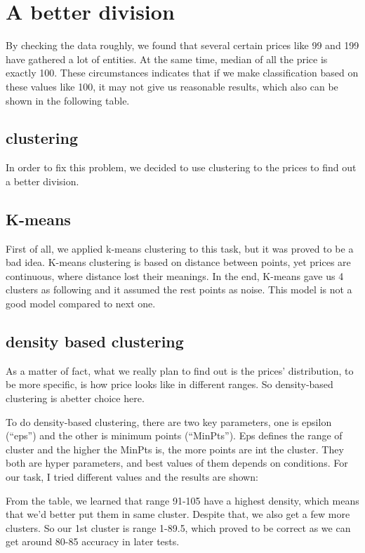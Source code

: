 \documentclass{sig-alternate}
\begin{document}
	\section{A better division}
	By checking the data roughly, we found that several certain prices like 99 and 199 have gathered
	a lot of entities. At the same time, median of all the price is exactly 100. These circumstances
	indicates that if we make classification based on these values like 100, it may not give us reasonable results, which
	also can be shown in the following table.

	\subsection{clustering}
	In order to fix this problem, we decided to use clustering to the prices to find out a better division. 
	\subsection{K-means}
	First of all, we applied k-means clustering to this task, but it was proved to be a bad idea.
	K-means clustering is based on distance between points, yet prices are continuous, where distance 
	lost their meanings. In the end, K-means gave us 4 clusters as following
	and it assumed the rest points as noise. This model is not a good model compared to next one.

	\subsection{density based clustering}

	As a matter of fact, what we really plan to find out is the prices' distribution, to be more specific, is
	how price looks like in different ranges. So density-based clustering 
	is abetter choice here.


	To do density-based clustering, there are two key parameters, one is epsilon (“eps”) and the other is minimum points (“MinPts”). 
	Eps defines the range of cluster and the higher the MinPts is, the more points are int the cluster. They both are hyper parameters,
	and best values of them depends on conditions. For our task, I tried different values and the results are shown:
	


	From the table, we learned that range 91-105 have a highest density, which means that we'd better put them in same cluster. 
	Despite that, we also get a few more clusters. So our 1st cluster is range 1-89.5, which proved to be correct as we can get 
	around 80-85 accuracy in later tests. 
\end{document}
